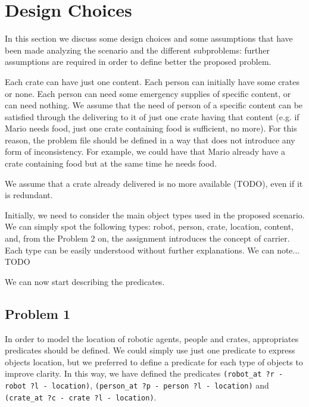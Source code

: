 
\section{Design Choices}
\label{sec3}

In this section we discuss some design choices and some assumptions that have been made 
analyzing the scenario and the different subproblems: further assumptions are required 
in order to define better the proposed problem.


Each crate can have just one content.
Each person can initially have some crates or none.
Each person can need some emergency supplies of specific content, or can need nothing.
We assume that the need of person of a specific content can be satisfied through the delivering 
to it of just one crate having that content (e.g. if Mario needs food, just one crate containing
food is sufficient, no more).
For this reason, the problem file should be defined in a way that does not introduce any form of inconsistency.
For example, we could have that Mario already have a crate containing food but at the same time he needs food.

We assume that a crate already delivered is no more available (TODO), even if it is redundant.


Initially, we need to consider the main object types used in the proposed scenario.
We can simply spot the following types: robot, person, crate, location, content, 
and, from the Problem 2 on, the assignment introduces the concept of carrier.
Each type can be easily understood without further explanations. 
We can note... TODO

We can now start describing the predicates.

\subsection{Problem 1}
In order to model the location of robotic agents, people and crates, appropriates predicates should be defined.
We could simply use just one predicate to express objects location, but we preferred to define a predicate for 
each type of objects to improve clarity. In this way, we have defined the predicates 
\texttt{(robot\_at ?r - robot ?l - location)}, \texttt{(person\_at ?p - person ?l - location)} and 
\texttt{(crate\_at ?c - crate ?l - location)}.



